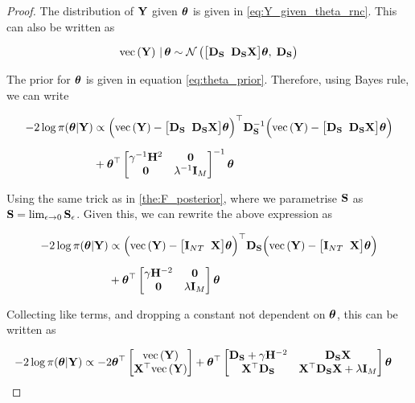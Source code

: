 \begin{proof}

    The distribution of $\mathbf{Y}$ given $\boldsymbol{\theta}$ is given in \cref{eq:Y_given_theta_rnc}. This can also be written as

    \begin{equation}
        \text{\textup{vec}}\left(\mathbf{Y}\right) \, | \, \boldsymbol{\theta} \sim \mathcal{N}\left(  \big[ \mathbf{D}_{\mathbf{S}} \;\; \mathbf{D}_{\mathbf{S}} \mathbf{X} \big]\boldsymbol{\theta}  , \; \mathbf{D}_{\mathbf{S}} \right)
    \end{equation}

    The prior for $\boldsymbol{\theta}$ is given in equation \cref{eq:theta_prior}. Therefore, using Bayes rule, we can write 

    \begin{align*}
        -2\log \pi(\boldsymbol{\theta} | \mathbf{Y}) &\propto \Big(\text{\textup{vec}}\left(\mathbf{Y}\right) - \big[ \mathbf{D}_{\mathbf{S}} \;\; \mathbf{D}_{\mathbf{S}} \mathbf{X} \big] \boldsymbol{\theta} \Big)^\top \mathbf{D}_{\mathbf{S}}^{-1} \Big(\text{\textup{vec}}\left(\mathbf{Y}\right) - \big[ \mathbf{D}_{\mathbf{S}} \;\; \mathbf{D}_{\mathbf{S}} \mathbf{X} \big] \boldsymbol{\theta} \Big) \\[0.2cm]
        & + \boldsymbol{\theta}^\top  \begin{bmatrix}
            \gamma^{-1} \mathbf{H}^{2} & \mathbf{0}\\
            \mathbf{0} & \lambda^{-1} \mathbf{I}_M   
           \end{bmatrix} ^{-1} \boldsymbol{\theta}
    \end{align*}

    Using the same trick as in \cref{the:F_posterior}, where we parametrise $\mathbf{S}$ as $\mathbf{S} = \lim_{\epsilon \rightarrow 0} \mathbf{S}_{\epsilon}$. Given this, we can rewrite the above expression as 

    \begin{align*}
        -2\log \pi(\boldsymbol{\theta} | \mathbf{Y}) &\propto \Big(\text{\textup{vec}}\left(\mathbf{Y}\right) - \big[ \mathbf{I}_{NT} \;\; \mathbf{X} \big] \boldsymbol{\theta} \Big)^\top \mathbf{D}_{\mathbf{S}}\Big(\text{\textup{vec}}\left(\mathbf{Y}\right) - \big[ \mathbf{I}_{NT} \;\; \mathbf{X} \big] \boldsymbol{\theta} \Big) \\[0.2cm]
        & + \boldsymbol{\theta}^\top  \begin{bmatrix}
            \gamma \mathbf{H}^{-2} & \mathbf{0}\\
            \mathbf{0} & \lambda \mathbf{I}_M   
           \end{bmatrix} \boldsymbol{\theta}
    \end{align*}

    Collecting like terms, and dropping a constant not dependent on $\boldsymbol{\theta}$, this can be written as 

    \begin{align*}
        -2\log \pi(\boldsymbol{\theta} | \mathbf{Y}) &\propto -2 \boldsymbol{\theta}^\top \begin{bmatrix} \text{\textup{vec}}\left(\mathbf{Y}\right) \\ \mathbf{X}^\top \text{\textup{vec}}\left(\mathbf{Y}\right) \end{bmatrix} + \boldsymbol{\theta}^\top \begin{bmatrix}
            \mathbf{D}_{\mathbf{S}} + \gamma \mathbf{H}^{-2} & \mathbf{D}_{\mathbf{S}}  \mathbf{X} \\
            \mathbf{X}^\top \mathbf{D}_{\mathbf{S}} & \mathbf{X}^\top \mathbf{D}_{\mathbf{S}} \mathbf{X} + \lambda \mathbf{I}_M   
           \end{bmatrix} \boldsymbol{\theta}
    \end{align*}


\end{proof}
